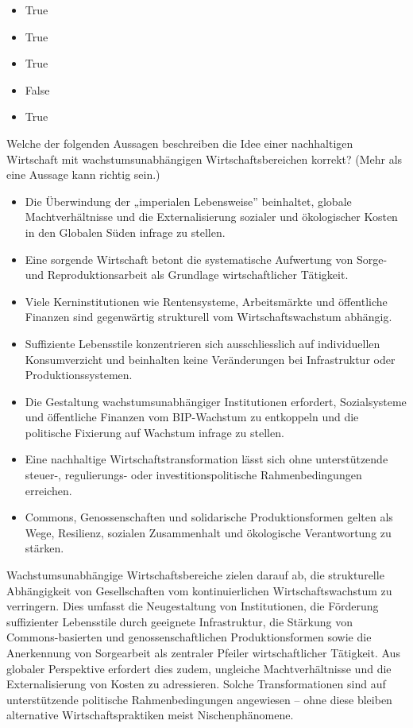 \documentclass[
  nswissgerman,
  a4paper,
  DIV=11,
  numbers=noendperiod,
  oneside,
  openany]{scrreprt}
\providecommand{\tightlist}{%
  \setlength{\itemsep}{0pt}\setlength{\parskip}{0pt}}
\begin{document}
\begin{itemize}
\tightlist
\item
  True
\item
  True
\item
  True
\item
  False
\item
  True
\end{itemize}

Welche der folgenden Aussagen beschreiben die Idee einer nachhaltigen
Wirtschaft mit wachstumsunabhängigen Wirtschaftsbereichen korrekt? (Mehr
als eine Aussage kann richtig sein.)

\begin{itemize}
\tightlist
\item[$\square$]
  Die Überwindung der „imperialen Lebensweise'' beinhaltet, globale
  Machtverhältnisse und die Externalisierung sozialer und ökologischer
  Kosten in den Globalen Süden infrage zu stellen.
\item[$\square$]
  Eine sorgende Wirtschaft betont die systematische Aufwertung von
  Sorge- und Reproduktionsarbeit als Grundlage wirtschaftlicher
  Tätigkeit.
\item[$\square$]
  Viele Kerninstitutionen wie Rentensysteme, Arbeitsmärkte und
  öffentliche Finanzen sind gegenwärtig strukturell vom
  Wirtschaftswachstum abhängig.
\item[$\square$]
  Suffiziente Lebensstile konzentrieren sich ausschliesslich auf
  individuellen Konsumverzicht und beinhalten keine Veränderungen bei
  Infrastruktur oder Produktionssystemen.
\item[$\square$]
  Die Gestaltung wachstumsunabhängiger Institutionen erfordert,
  Sozialsysteme und öffentliche Finanzen vom BIP-Wachstum zu entkoppeln
  und die politische Fixierung auf Wachstum infrage zu stellen.
\item[$\square$]
  Eine nachhaltige Wirtschaftstransformation lässt sich ohne
  unterstützende steuer-, regulierungs- oder investitionspolitische
  Rahmenbedingungen erreichen.
\item[$\square$]
  Commons, Genossenschaften und solidarische Produktionsformen gelten
  als Wege, Resilienz, sozialen Zusammenhalt und ökologische
  Verantwortung zu stärken.
\end{itemize}

Wachstumsunabhängige Wirtschaftsbereiche zielen darauf ab, die
strukturelle Abhängigkeit von Gesellschaften vom kontinuierlichen
Wirtschaftswachstum zu verringern. Dies umfasst die Neugestaltung von
Institutionen, die Förderung suffizienter Lebensstile durch geeignete
Infrastruktur, die Stärkung von Commons-basierten und
genossenschaftlichen Produktionsformen sowie die Anerkennung von
Sorgearbeit als zentraler Pfeiler wirtschaftlicher Tätigkeit. Aus
globaler Perspektive erfordert dies zudem, ungleiche Machtverhältnisse
und die Externalisierung von Kosten zu adressieren. Solche
Transformationen sind auf unterstützende politische Rahmenbedingungen
angewiesen -- ohne diese bleiben alternative Wirtschaftspraktiken meist
Nischenphänomene.
\end{document}
